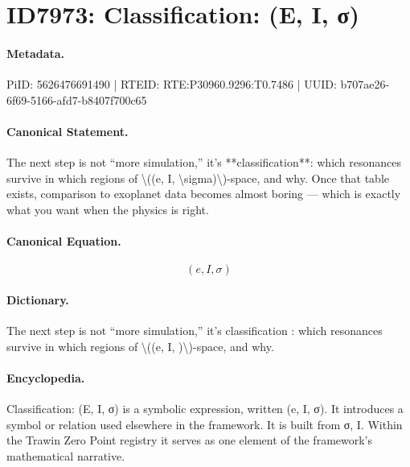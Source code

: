 \section*{ID7973: Classification: (E, I, σ)}
\paragraph{Metadata.}
PiID: 5626476691490 | RTEID: RTE:P30960.9296:T0.7486 | UUID: b707ae26-6f69-5166-afd7-b8407f700c65

\paragraph{Canonical Statement.}
The next step is not “more simulation,” it’s **classification**: which resonances survive in which regions of \textbackslash{}((e, I, \textbackslash{}sigma)\textbackslash{})-space, and why. Once that table exists, comparison to exoplanet data becomes almost boring — which is exactly what you want when the physics is right.

\paragraph{Canonical Equation.}
\[
(e, I, \sigma)
\]

\paragraph{Dictionary.}
The next step is not “more simulation,” it’s classification : which resonances survive in which regions of \textbackslash{}((e, I, )\textbackslash{})-space, and why.

\paragraph{Encyclopedia.}
Classification: (E, I, σ) is a symbolic expression, written (e, I, σ). It introduces a symbol or relation used elsewhere in the framework. It is built from σ, I. Within the Trawin Zero Point registry it serves as one element of the framework's mathematical narrative.
